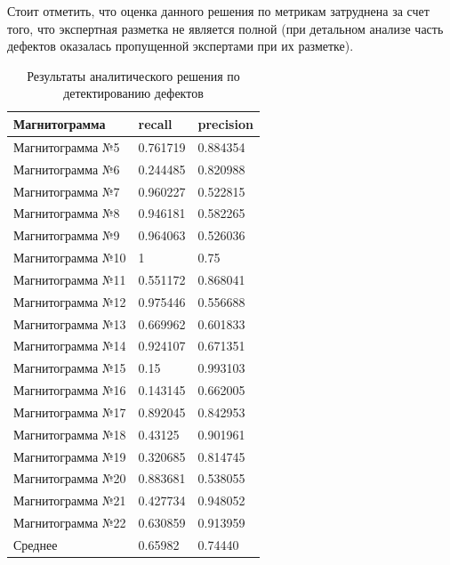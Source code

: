 \documentclass[a4paper,article,14pt]{extarticle}
\begin{document}
Стоит отметить, что оценка данного решения по метрикам затруднена за счет того, 
что экспертная разметка не является полной (при детальном анализе часть дефектов оказалась 
пропущенной экспертами при их разметке).

\begin{center}
    \begin{longtable}{|p{5cm}|p{3cm}|p{3cm}|}
        \caption{Результаты аналитического решения по детектированию дефектов} \\ \hline
        Магнитограмма	& recall	& precision \\ \hline
        Магнитограмма №5	& 0.761719	& 0.884354 \\ \hline
        Магнитограмма №6	& 0.244485	& 0.820988 \\ \hline
        Магнитограмма №7	& 0.960227	& 0.522815 \\ \hline
        Магнитограмма №8	& 0.946181	& 0.582265 \\ \hline
        Магнитограмма №9	& 0.964063	& 0.526036 \\ \hline
        Магнитограмма №10	& 1	        & 0.75 \\ \hline
        Магнитограмма №11	& 0.551172	& 0.868041 \\ \hline
        Магнитограмма №12	& 0.975446	& 0.556688 \\ \hline
        Магнитограмма №13	& 0.669962	& 0.601833 \\ \hline
        Магнитограмма №14	& 0.924107	& 0.671351 \\ \hline
        Магнитограмма №15	& 0.15	    & 0.993103 \\ \hline
        Магнитограмма №16	& 0.143145	& 0.662005 \\ \hline
        Магнитограмма №17	& 0.892045	& 0.842953 \\ \hline
        Магнитограмма №18	& 0.43125	& 0.901961 \\ \hline
        Магнитограмма №19	& 0.320685	& 0.814745 \\ \hline
        Магнитограмма №20	& 0.883681	& 0.538055 \\ \hline
        Магнитограмма №21	& 0.427734	& 0.948052 \\ \hline
        Магнитограмма №22	& 0.630859	& 0.913959 \\ \hline
        Среднее	& 0.65982	& 0.74440 \\ \hline
    \end{longtable}
\end{center}
\end{document}
